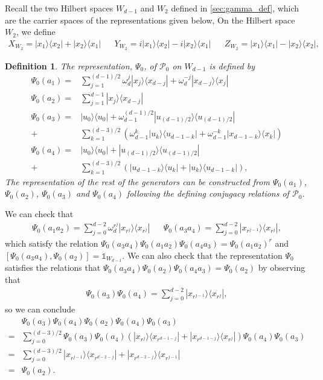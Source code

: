\documentclass[11pt,letterpaper]{article}
\newcommand{\ketbra}[2]{|#1\rangle\langle#2|}
\newcommand{\1}{\mathbb{1}}
\newcommand{\Pg}{\mathcal{P}}
\newtheorem{definition}[theorem]{Definition}
\theoremstyle{definition}
\begin{document}
Recall the two Hilbert spaces $W_{d-1}$ and $W_2$ defined in \cref{sec:gamma_def}, which are the carrier spaces
of the representations given below,
On the Hilbert space $W_2$, we define
\begin{align*}
	X_{W_2} = \ketbra{x_1}{x_2} + \ketbra{x_2}{x_1} &&
	Y_{W_2} = i\ketbra{x_1}{x_2} - i \ketbra{x_2}{x_1} &&
	Z_{W_2} = \ketbra{x_1}{x_1} - \ketbra{x_2}{x_2},
\end{align*}
\begin{definition}
\label{def:rep_g0}
The representation, $\Psi_0$, of $\Pg_0$ on $W_{d-1}$ is defined by
\begin{align*}
	\Psi_0(a_1) =&\sum_{j=1}^{(d-1)/2} \omega_d^j \ketbra{x_j}{x_{d-j}} + \omega_d^{-j} \ketbra{x_{d-j}}{x_{j}} \\
	\Psi_0(a_2) = &\sum_{j=1}^{d-1} \ketbra{x_j}{x_{d-j}}\\
	\Psi_0(a_3) = &\ketbra{u_0}{u_0} +\omega_{d-1}^{(d-1)/2}\ketbra{u_{(d-1)/2}}{u_{(d-1)/2}}\\ + 
	&\sum_{k=1}^{(d-3)/2}\left( \omega_{d-1}^k\ketbra{u_k}{u_{d-1-k}} + \omega_{d-1}^{-k}\ketbra{x_{d-1-k}}{x_k}\right)\\ 
	\Psi_0(a_4) = &\ketbra{u_0}{u_0} +\ketbra{u_{(d-1)/2}}{u_{(d-1)/2}} \\+
	 &\sum_{k=1}^{(d-3)/2}\left(\ketbra{u_{d-1-k}}{u_k} + \ketbra{u_k}{u_{d-1-k}}\right),
\end{align*}
The representation of the rest of the generators
can be constructed from $\Psi_0(a_1)$, $\Psi_0(a_2)$, $\Psi_0(a_3)$ and $\Psi_0(a_4)$ following the defining 
conjugacy relations of $\Pg_0$.
\end{definition}
We can check that
\begin{align*}
	\Psi_0(a_1a_2) =  \sum_{j=0}^{d-2} \omega_d^{r^j} \ketbra{x_{r^j}}{x_{r^j}} &&
	\Psi_0(a_3a_4) =  \sum_{j=0}^{d-2} \ketbra{x_{r^{j-1}}}{x_{r^j}},
\end{align*}
which satisfy the relation $\Psi_0(a_3a_4) \Psi_0(a_1a_2) \Psi_0(a_4a_3) = \Psi_0(a_1a_2)^r$ and
$[\Psi_0(a_3a_4), \Psi_0(a_2)] = \1_{W_{d-1}}$. 
We can also check that the representation $\Psi_0$ satisfies the relations
that $\Psi_0(a_3a_4) \Psi_0(a_2) \Psi_0(a_4a_3) = \Psi_0(a_2)$ by observing that
	\begin{align*}
		\Psi_0(a_3)\Psi_0(a_4)= \sum_{j=0}^{d-2} \ketbra{x_{r^{j-1}}}{x_{r^j}},
	\end{align*}
	so we can conclude  
	\begin{align*}
		&\Psi_0(a_3)\Psi_0(a_4) \Psi_0(a_2) \Psi_0(a_4) \Psi_0(a_3)\\
		= &\sum_{j=0}^{(d-3)/2} \Psi_0(a_3)\Psi_0(a_4) (\ketbra{x_{r^j}}{x_{r^{d-1-j}}}+\ketbra{x_{r^{d-1-j}}}{x_{r^j}}) \Psi_0(a_4)\Psi_0(a_3)\\
		=& \sum_{j=0}^{(d-3)/2} \ketbra{x_{r^{j-1}}}{x_{r^{d-2-j}}}+\ketbra{x_{r^{d-2-j}}}{x_{r^{j-1}}}\\ 
		=& \Psi_0(a_2).
	\end{align*}
\end{document}
